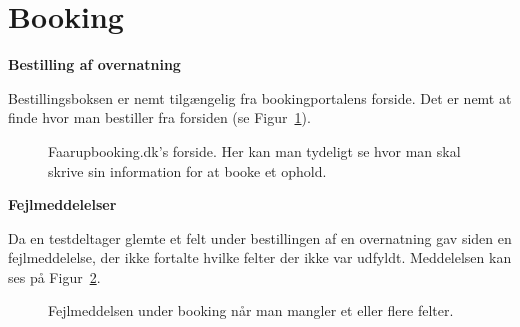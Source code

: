 \documentclass[10pt,a4paper]{article}      %
\newcommand\pic[1]{\texttt{[image: Pics/\#1]}}
\renewcommand\good{\pic{good}}
\renewcommand\smallproblem{\pic{smallproblem}}
\begin{document}
\section{Booking}
\begin{kommentarer}
\item[\good] \textbf{Bestilling af overnatning}

Bestillingsboksen er nemt tilgængelig fra bookingportalens forside. Det er nemt
at finde hvor man bestiller fra forsiden (se Figur~\ref{fig:forsidebooking}). 


\begin{figure}[htbp]
    \centering
    \caption{Faarupbooking.dk's forside. Her kan man tydeligt se hvor man skal
    skrive sin information for at booke et ophold.}
    \label{fig:forsidebooking}
\end{figure}

\item[\smallproblem] \textbf{Fejlmeddelelser}

Da en testdeltager glemte et felt under bestillingen af en overnatning gav siden
en fejlmeddelelse, der ikke fortalte hvilke felter der ikke var udfyldt.
Meddelelsen kan ses på Figur~\ref{fig:fejlmeddelelsebooking}.

\begin{figure}[htbp]
    \centering
    \caption{Fejlmeddelsen under booking når man mangler et eller flere felter.}
    \label{fig:fejlmeddelelsebooking}
\end{figure}


\end{kommentarer}
\end{document}
